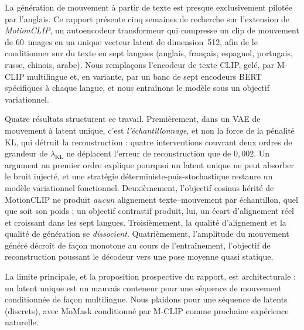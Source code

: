 \documentclass[11pt,a4paper]{report}
\newcommand{\lkl}{\ensuremath{\lambda_{\mathrm{KL}}}}
\begin{document}
La génération de mouvement à partir de texte est presque exclusivement
pilotée par l'anglais. Ce rapport présente cinq semaines de recherche sur
l'extension de \emph{MotionCLIP}, un autoencodeur transformeur qui
compresse un clip de mouvement de 60~images en un unique vecteur latent de
dimension~512, afin de le conditionner sur du texte en sept langues
(anglais, français, espagnol, portugais, russe, chinois, arabe). Nous
remplaçons l'encodeur de texte CLIP, gelé, par M-CLIP multilingue et, en
variante, par un banc de sept encodeurs BERT spécifiques à chaque langue,
et nous entraînons le modèle sous un objectif variationnel.

Quatre résultats structurent ce travail. Premièrement, dans un VAE de
mouvement à latent unique, c'est \emph{l'échantillonnage}, et non la force
de la pénalité KL, qui détruit la reconstruction : quatre interventions
couvrant deux ordres de grandeur de \lkl{} ne déplacent l'erreur de
reconstruction que de $0{,}002$. Un argument au premier ordre explique
pourquoi un latent unique ne peut absorber le bruit injecté, et une
stratégie déterministe-puis-stochastique restaure un modèle variationnel
fonctionnel. Deuxièmement, l'objectif cosinus hérité de MotionCLIP ne
produit \emph{aucun} alignement texte--mouvement par échantillon, quel que
soit son poids ; un objectif contrastif produit, lui, un écart
d'alignement réel et croissant dans les sept langues. Troisièmement, la
qualité d'alignement et la qualité de génération se \emph{dissocient}.
Quatrièmement, l'amplitude du mouvement généré décroît de façon monotone
au cours de l'entraînement, l'objectif de reconstruction poussant le
décodeur vers une pose moyenne quasi statique.

La limite principale, et la proposition prospective du rapport, est
architecturale : un latent unique est un mauvais conteneur pour une
séquence de mouvement conditionnée de façon multilingue. Nous plaidons
pour une séquence de latents (discrets), avec MoMask conditionné par
M-CLIP comme prochaine expérience naturelle.

\tableofcontents
\listoffigures
\listoftables
\end{document}
